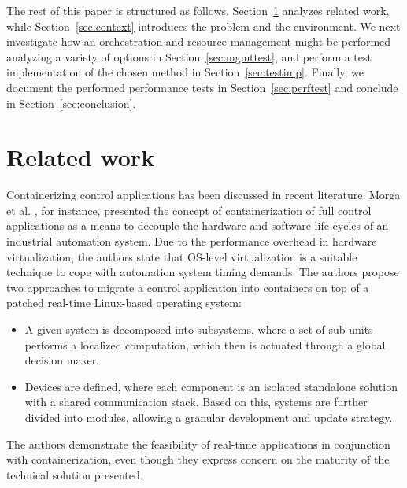 \documentclass[]{scrartcl}
\begin{document}
The rest of this paper is structured as follows. Section~\ref{sec:relwork} analyzes related work, while Section~\ref{sec:context} introduces the problem and the environment.
We next investigate how an orchestration and resource management might be performed analyzing a variety of options in Section~\ref{sec:mgmttest}, and perform a test implementation of the chosen method in Section~\ref{sec:testimp}.
Finally, we document the performed performance tests in Section~\ref{sec:perftest} and conclude in Section~\ref{sec:conclusion}.

\section{Related work}
\label{sec:relwork}

Containerizing control applications has been discussed in recent literature. 
Morga et al. \cite{Mogaetal2016}, for instance, presented the concept of containerization of full control applications as a means to decouple the hardware and software life-cycles of an industrial automation system.
Due to the performance overhead in hardware virtualization, the authors state that OS-level virtualization is a suitable technique to cope with automation system timing demands.
The authors propose two approaches to migrate a control application into containers on top of a patched real-time Linux-based operating system: 
\begin{itemize}
	\item A given system is decomposed into subsystems, where a set of sub-units performs a localized computation, which then is actuated through a global decision maker. 
	\item Devices are defined, where each component is an isolated standalone solution with a shared communication stack.
	Based on this, systems are further divided into modules, allowing a granular development and update strategy. 
\end{itemize}
The authors demonstrate the feasibility of real-time applications in conjunction with containerization, even though they express concern on the maturity of the technical solution presented.
\end{document}
